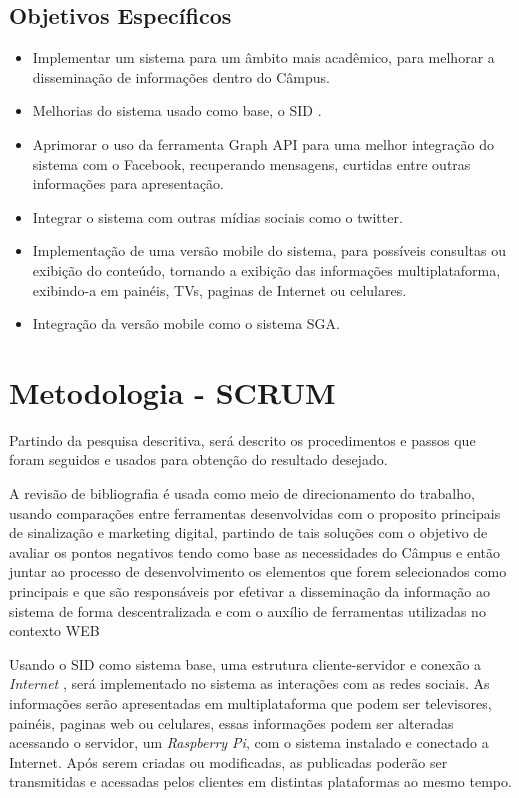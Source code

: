 

\subsection{Objetivos Específicos}
	 \begin{itemize}
	\item Implementar um sistema para um âmbito mais acadêmico, para melhorar a disseminação de informações dentro do Câmpus.
	 	
	\item Melhorias do sistema usado como base, o SID \cite{sobrinho2017}.
	
	\item Aprimorar o uso da ferramenta Graph API para uma melhor integração do sistema com o Facebook, recuperando mensagens, curtidas entre outras informações para apresentação.
	
	\item Integrar o sistema com outras mídias sociais como o twitter.
	
	\item Implementação de uma versão mobile do sistema, para possíveis consultas ou exibição do conteúdo, tornando a exibição das informações multiplataforma, exibindo-a em painéis, TVs, paginas de Internet ou celulares.
	
	\item  Integração da versão mobile como o sistema SGA.
	\end{itemize}
\section{Metodologia - SCRUM}
Partindo da pesquisa descritiva, será descrito os procedimentos e passos que foram seguidos e usados para obtenção do resultado desejado.
	
A revisão de bibliografia é usada como meio de direcionamento do trabalho, usando comparações entre ferramentas desenvolvidas com o proposito principais de sinalização e marketing digital, partindo de tais soluções com o objetivo de avaliar os pontos negativos tendo como base as necessidades do Câmpus e então juntar ao processo de desenvolvimento os elementos que forem selecionados como principais e que são responsáveis por efetivar a disseminação da informação ao sistema de forma descentralizada e com o auxílio de ferramentas utilizadas no contexto WEB
	 
Usando o SID como sistema base, uma estrutura cliente-servidor e conexão a \textit{Internet} , será implementado no sistema as interações com as redes sociais. As informações serão apresentadas em multiplataforma que podem ser televisores, painéis, paginas web ou celulares, essas informações podem ser alteradas acessando o servidor, um \textit{Raspberry Pi}, com o sistema instalado e conectado a Internet. Após serem criadas ou modificadas, as publicadas poderão ser transmitidas e acessadas pelos clientes em distintas plataformas ao mesmo tempo.
	
